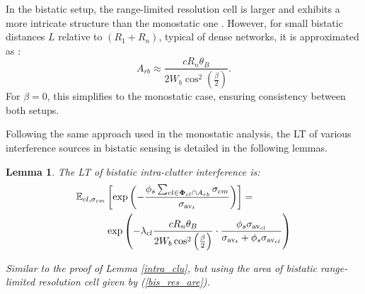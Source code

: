 \documentclass[journal]{IEEEtran}
\newtheorem{lemma}{\textbf{Lemma}}
\begin{document}
In the bistatic setup, the range-limited resolution cell is larger and exhibits a more intricate structure than the monostatic one \cite{willis2005bistatic}. However, for small bistatic distances \( L \) relative to \(( R_1 + R_n )\), typical of dense networks, it is approximated as \cite{willis2005bistatic,ram2022estimation}:
\begin{equation}\label{bis_res_are}
  A_{rb} \approx \frac{c R_n \theta_B}{2 W_b \cos^2\left(\frac{\beta}{2}\right)}.  
\end{equation}
For \(\beta = 0\), this simplifies to the monostatic case, ensuring consistency between both setups.

Following the same approach used in the monostatic analysis, the LT of various interference sources in bistatic sensing is detailed in the following lemmas.
\begin{lemma} \label{intra_clu_bi}
The LT of bistatic intra-clutter interference is:
\begin{equation}\label{intra_clu_int_bi}
\begin{aligned}
\mathbb{E}_{cl, \sigma_{cm}} &\left[ \exp \left( - \frac{\phi_s \sum_{cl \in \bold\Phi_{cl} \cap A_{rb}} \sigma_{cm}}{\sigma_{\text{av}_t}} \right) \right]=\\
& \exp \left( - \lambda_{cl} \frac{c  R_n  \theta_B}{2 W_b\cos^2\left(\frac{\beta}{2}\right)} \cdot \frac{\phi_s \sigma_{\text{av}_{cl}}}{\sigma_{\text{av}_t}+ \phi_s \sigma_{\text{av}_{cl}}} \right) 
\end{aligned}
\end{equation}
\begin{IEEEproof}
Similar to the proof of Lemma \ref{intra_clu}, but using the area of bistatic range-limited resolution cell given by (\ref{bis_res_are}).
\end{IEEEproof}
\end{lemma}
\end{document}
